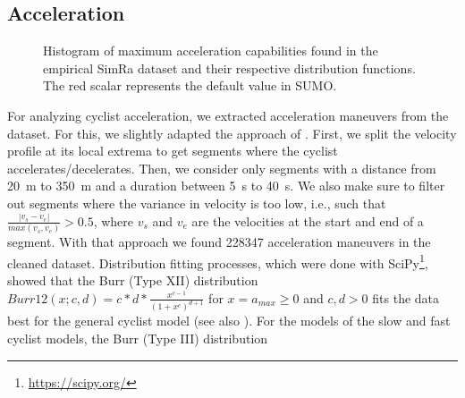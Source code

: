 \subsection{Acceleration}
\label{subsec:acceleration_preprocessing}
\begin{figure}
    \centering
    \hfill
    \caption{%
        Histogram of maximum acceleration capabilities found in the empirical SimRa dataset and their respective distribution functions.
        The red scalar represents the default value in SUMO.
    }%
    \label{fig:analysis_max_acceleration_dist_fit}
\end{figure}

For analyzing cyclist acceleration, we extracted acceleration maneuvers from the dataset.
For this, we slightly adapted the approach of \cite{ma2016modeling}.
First, we split the velocity profile at its local extrema to get segments where the cyclist accelerates/decelerates.
Then, we consider only segments with a distance from \SI{20}{\metre} to \SI{350}{\metre} and a duration between \SI{5}{\second} to \SI{40}{\second}.
We also make sure to filter out segments where the variance in velocity is too low, i.e., such that $ \frac{|v_{s} - v_{e}|}{max(v_{s},v_{e})} > 0.5 $, where $v_{s}$ and $v_{e}$ are the velocities at the start and end of a segment.
With that approach we found \num{228347} acceleration maneuvers in the cleaned dataset.
Distribution fitting processes, which were done with SciPy\footnote{\url{https://scipy.org/}}, showed that the Burr (Type XII) distribution~\cite{burr1942cumulative} $Burr12(x; c,d) = c*d*\frac{x^{c-1}}{(1+x^c)^{d+1}}$ for $x = a_{max} \geq 0$ and $c,d > 0$  fits the data best for the general cyclist model (see also ).
For the models of the slow and fast cyclist models, the Burr (Type III) distribution~\cite{burr1942cumulative}

